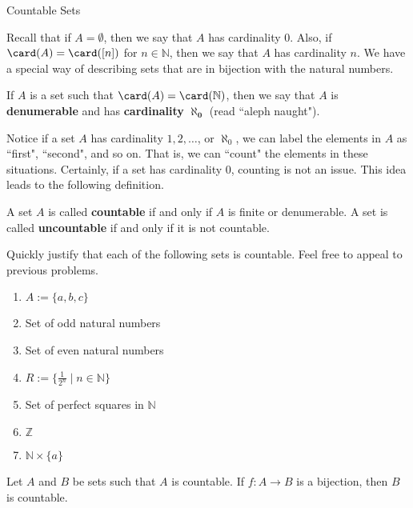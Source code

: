 \begin{section}{Countable Sets}

Recall that if $A=\emptyset$, then we say that $A$ has cardinality 0.  Also, if $\card(A)=\card([n])$ for $n\in\mathbb{N}$, then we say that $A$ has cardinality $n$.  We have a special way of describing sets that are in bijection with the natural numbers.

\begin{definition}
If $A$ is a set such that $\card(A)=\card(\mathbb{N})$, then we say that $A$ is \textbf{denumerable} and has \textbf{cardinality} $\mathbf{\aleph_0}$ (read ``aleph naught").
\end{definition}

Notice if a set $A$ has cardinality $1,2,\ldots$, or $\aleph_0$, we can label the elements in $A$ as ``first", ``second", and so on.  That is, we can ``count" the elements in these situations. Certainly, if a set has cardinality 0, counting is not an issue.  This idea leads to the following definition.

\begin{definition}\label{def:countable}
A set $A$ is called \textbf{countable} if and only if $A$ is finite or denumerable. A set is called \textbf{uncountable} if and only if it is not countable.
\end{definition}

\begin{problem}
Quickly justify that each of the following sets is countable. Feel free to appeal to previous problems.
\begin{enumerate}[label=\textrm{(\alph*)}]
\item $A:=\{a,b,c\}$
\item Set of odd natural numbers
\item Set of even natural numbers
\item $R:=\{\frac{1}{2^n}\mid n\in \mathbb{N}\}$
\item Set of perfect squares in $\mathbb{N}$
\item $\mathbb{Z}$
\item $\mathbb{N}\times \{a\}$
\end{enumerate}
\end{problem}

\begin{theorem}
Let $A$ and $B$ be sets such that $A$ is countable. If $f:A\to B$ is a bijection, then $B$ is countable.
\end{theorem}


\end{section}
